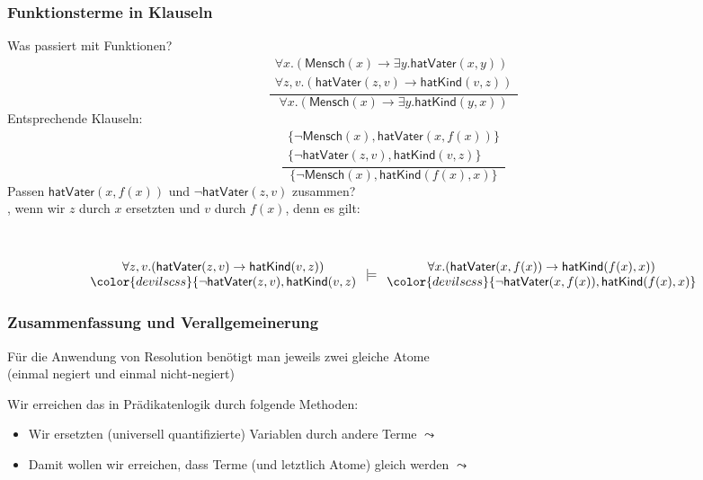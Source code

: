 \documentclass[aspectratio=1610,onlymath]{beamer}
\begin{document}
\begin{frame}\frametitle{Funktionsterme in Klauseln}

Was passiert mit Funktionen?
%
\[ \frac{
\begin{array}{c}
\forall x.(\textsf{Mensch}(x)\to\exists y.\textsf{hatVater}(x,y))\\
\forall z,v.(\textsf{hatVater}(z,v)\to\textsf{hatKind}(v,z))
\end{array}
}
{
\forall x.(\textsf{Mensch}(x)\to\exists y.\textsf{hatKind}(y,x))
}
\]
%
Entsprechende Klauseln:
\[ \frac{
\begin{array}{c}
\{\neg\textsf{Mensch}(x),\textsf{hatVater}(x,f(x))\}\\
\{\neg\textsf{hatVater}(z,v),\textsf{hatKind}(v,z)\}
\end{array}
}
{
\{\neg\textsf{Mensch}(x),\textsf{hatKind}(f(x),x)\}
}
\]
Passen $\textsf{hatVater}(x,f(x))$ und $\neg\textsf{hatVater}(z,v)$ zusammen?\\\pause
{}, wenn wir $z$ durch $x$ ersetzten und $v$ durch $f(x)$, denn es gilt:

~\hspace{-1cm}%
\begin{minipage}{8cm}
\footnotesize
\[\begin{array}{c}
\forall z,v.(\textsf{hatVater}(z,v)\to\textsf{hatKind}(v,z))\\
{\color{devilscss}\{\neg\textsf{hatVater}(z,v),\textsf{hatKind}(v,z)}
\end{array}
\models
\begin{array}{c}
\forall x.(\textsf{hatVater}(x,f(x))\to\textsf{hatKind}(f(x),x))\\
{\color{devilscss}\{\neg\textsf{hatVater}(x,f(x)),\textsf{hatKind}(f(x),x)\}}
\end{array}
\]
\end{minipage}

\end{frame}

\begin{frame}\frametitle{Zusammenfassung und Verallgemeinerung}

Für die Anwendung von Resolution benötigt man jeweils zwei gleiche Atome\\ (einmal negiert und einmal nicht-negiert)\medskip

Wir erreichen das in Prädikatenlogik durch folgende Methoden:
\begin{itemize}
\item Wir ersetzten (universell quantifizierte) Variablen durch andere Terme $\leadsto$~
\item Damit wollen wir erreichen, dass Terme (und letztlich Atome) gleich werden $\leadsto$~
\end{itemize}

\end{frame}
\end{document}
